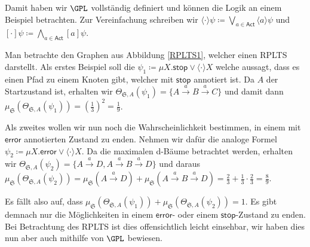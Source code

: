 Damit haben wir $\GPL$ vollständig definiert und können die Logik an einem Beispiel betrachten.
Zur Vereinfachung schreiben wir $\langle \cdot \rangle\psi\coloneqq \bigvee_{a\in\mathsf{Act}}\langle a\rangle \psi$ und $[\cdot]\psi \coloneqq \bigwedge_{a\in\mathsf{Act}}[a]\psi$.

\begin{example}
	Man betrachte den Graphen aus Abbildung \ref{RPLTS1}, welcher einen RPLTS darstellt. 
	Als erstes Beispiel soll die \fuzzy $\psi_1\coloneqq \mu X. \mathsf{stop} \lor \langle\cdot\rangle X$ welche aussagt, dass es einen Pfad zu einem Knoten gibt, welcher mit $\mathsf{stop}$ annotiert ist.
	Da $A$ der Startzustand ist, erhalten wir $\Theta_{\mathfrak{S},A}(\psi_1) = \{A\xrightarrow{a}B\xrightarrow{a}C\}$ und damit dann $\mu_\mathfrak{S}(\Theta_{\mathfrak{S},A}(\psi_1)) = \left(\frac{1}{3}\right)^2=\frac{1}{9}$.
	
	Als zweites wollen wir nun noch die Wahrscheinlichkeit bestimmen, in einem mit $\mathsf{error}$ annotierten Zustand zu enden. 
	Nehmen wir dafür die analoge Formel $\psi_2\coloneqq \mu X.\mathsf{error}\lor \langle \cdot \rangle X$.
	Da die maximalen d-Bäume betrachtet werden, erhalten wir $\Theta_{\mathfrak{S},A}(\psi_2) = \{A\xrightarrow{a}D, A\xrightarrow{a}B\xrightarrow{a}D\}$ und daraus $\mu_\mathfrak{S}(\Theta_{\mathfrak{S},A}(\psi_2)) = \mu_\mathfrak{S}(A\xrightarrow{a}D) + \mu_\mathfrak{S}(A\xrightarrow{a}B\xrightarrow{a}D) = \frac{2}{3}+\frac{1}{3}\cdot\frac{2}{3}=\frac{8}{9}$.
	
	Es fällt also auf, dass $\mu_\mathfrak{S}(\Theta_{\mathfrak{S},A}(\psi_1)) + \mu_\mathfrak{S}(\Theta_{\mathfrak{S},A}(\psi_2)) = 1$.
	Es gibt demnach nur die Möglichkeiten in einem $\mathsf{error}$- oder einem $\mathsf{stop}$-Zustand zu enden.
	Bei Betrachtung des RPLTS ist dies offensichtlich leicht einsehbar, wir haben dies nun aber auch mithilfe von $\GPL$ bewiesen.
\end{example}

